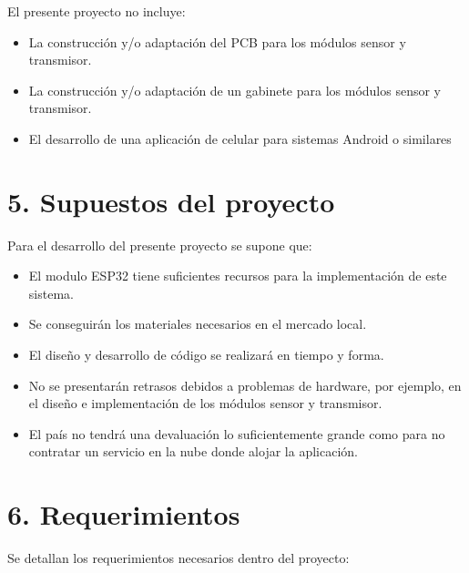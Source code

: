 \documentclass[
11pt, %
]{charter}
\begin{document}
El presente proyecto no incluye:

\begin{itemize}
\item{La construcción y/o adaptación del PCB para los módulos sensor y transmisor.}
\item{La construcción y/o adaptación de un gabinete para los módulos sensor y transmisor.}
\item{El desarrollo de una aplicación de celular para sistemas Android o similares}
\end{itemize}




\section{5. Supuestos del proyecto}
\label{sec:supuestos}


Para el desarrollo del presente proyecto se supone que:

\begin{itemize}
\item{El modulo ESP32 tiene suficientes recursos para la implementación de este sistema.}
\item{Se conseguirán los materiales necesarios en el mercado local.}
\item{El diseño y desarrollo de código se realizará en tiempo y forma.}
\item{No se presentarán retrasos debidos a problemas de hardware, por ejemplo, en el diseño e implementación de los módulos sensor y transmisor.}
\item{El país no tendrá una devaluación lo suficientemente grande como para no contratar un servicio en la nube donde alojar la aplicación.}
\end{itemize}







\section{6. Requerimientos}
\label{sec:requerimientos}

Se detallan los requerimientos necesarios dentro del proyecto:
\end{document}
